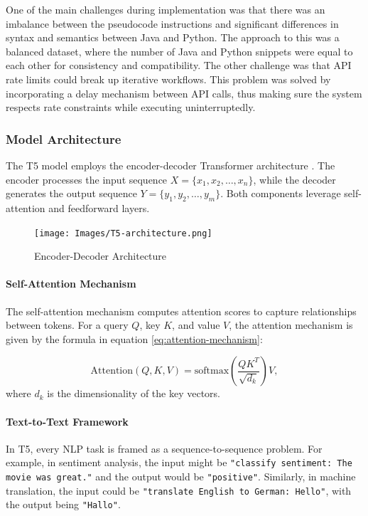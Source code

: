 \documentclass{dhbenelux}
\begin{document}
One of the main challenges during implementation was that there was an imbalance between the pseudocode instructions and significant differences in syntax and semantics between Java and Python. The approach to this was a balanced dataset, where the number of Java and Python snippets were equal to each other for consistency and compatibility. The other challenge was that API rate limits could break up iterative workflows. This problem was solved by incorporating a delay mechanism between API calls, thus making sure the system respects rate constraints while executing uninterruptedly.
\subsubsection{Model Architecture}
The T5 model employs the encoder-decoder Transformer architecture \cite{kyle2021}. The encoder processes the input sequence $X = \{x_1, x_2, \dots, x_n\}$, while the decoder generates the output sequence $Y = \{y_1, y_2, \dots, y_m\}$. Both components leverage self-attention and feedforward layers.

\begin{figure}[h]
\centering
\texttt{[image: Images/T5-architecture.png]}
\caption{Encoder-Decoder Architecture}
\label{fig:encoder-decoder-architecture}
\end{figure}

\paragraph{Self-Attention Mechanism}
The self-attention mechanism computes attention scores to capture relationships between tokens. For a query \(Q\), key \(K\), and value \(V\), the attention mechanism is given by the formula in equation \ref{eq:attention-mechanism}:

\begin{equation}
\text{Attention}(Q, K, V) = \text{softmax}\left(\frac{QK^T}{\sqrt{d_k}}\right)V,
\label{eq:attention-mechanism}
\end{equation}
where \(d_k\) is the dimensionality of the key vectors.


\paragraph{Text-to-Text Framework}
In T5, every NLP task is framed as a sequence-to-sequence problem. For example, in sentiment analysis, the input might be \texttt{"classify sentiment: The movie was great."} and the output would be \texttt{"positive"}. Similarly, in machine translation, the input could be \texttt{"translate English to German: Hello"}, with the output being \texttt{"Hallo"}.
\end{document}
